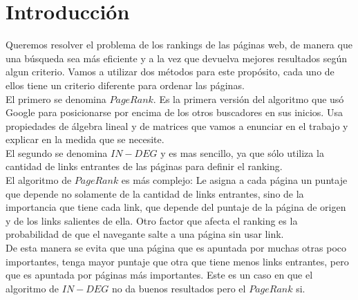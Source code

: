 \section{Introducción}

Queremos resolver el problema de los rankings de las páginas web, de manera que una búsqueda  sea más eficiente y a la vez que devuelva mejores resultados según algun criterio. 
Vamos a utilizar dos métodos para este propósito, cada uno de ellos tiene un criterio diferente para ordenar las páginas. \\

El primero se denomina $PageRank$. Es la primera versión del algoritmo que usó Google para posicionarse por encima de los otros buscadores en sus inicios. Usa propiedades de álgebra lineal y de matrices que vamos a enunciar en el trabajo y explicar en la medida que se necesite.\\

El segundo se denomina $IN-DEG$ y es mas sencillo, ya que sólo utiliza la cantidad de links entrantes de las páginas para definir el ranking.\\

El algoritmo de $PageRank$ es más complejo: Le asigna a cada página un puntaje que depende no solamente de la cantidad de links entrantes, sino de la importancia que tiene cada link, que depende del puntaje de la página de origen y de los links salientes de ella. Otro factor que afecta el ranking es la probabilidad de que el navegante salte a una página sin usar link. \\

De esta manera se evita que una página que es apuntada por muchas otras poco importantes, tenga mayor puntaje que otra que tiene menos links entrantes, pero que es apuntada por páginas más importantes. Este es un caso en que el algoritmo de $IN-DEG$ no da buenos resultados pero el $PageRank$ si.


